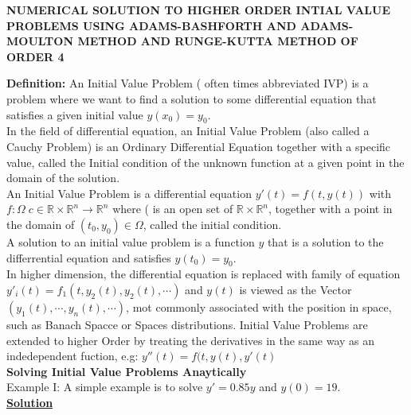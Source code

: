 \documentclass[a4paper 11pt]{article}
\newcommand{\bt}[1]{\textbf{#1}}
\newcommand{\NI}{\noindent}
\newcommand{\IVP}{Initial Value Problem }
\newcommand{\IVPs}{Initial Value Problems }
\newcommand{\realnum}{\mathbb{R}}
\newcommand{\sprime}{'}
\newcommand{\dprime}{''}
\begin{document}
\begin{center}
\textbf{NUMERICAL SOLUTION TO HIGHER ORDER INTIAL VALUE PROBLEMS USING ADAMS-BASHFORTH AND ADAMS-MOULTON METHOD AND RUNGE-KUTTA METHOD OF ORDER 4} \\[1.5cm]
\end{center}

\NI \bt{Definition:} An \IVP ( often times abbreviated IVP) is a problem where we want to find a solution to some differential equation that satisfies a given initial value \(\displaystyle y(x_0) = y_0\). \\

\NI In the field of differential equation, an \IVP (also called a Cauchy Problem) is an Ordinary Differential Equation together with a specific value, called the Initial condition of the unknown function at a given point in the domain of the solution.\\

\NI An \IVP is a differential equation  \( \displaystyle y\sprime(t) = f(t, y(t))\) with \( \displaystyle f:\Omega\; c \in \realnum \times \realnum^{n} \rightarrow \realnum^{n}\) where ( is an open set of \(\displaystyle \realnum \times \realnum^{n}\), together with a point in the domain of \((t_0,y_0) \in \Omega  \), called the initial condition.\\

\NI A solution to an initial value problem is a function \(y\) that is a solution to the differrential equation and satisfies \(\displaystyle y(t_0) = y_0\).\\

\NI In higher dimension, the differential equation is replaced with family of equation \(\displaystyle y\sprime_{i}(t) = f_{1}(t,y_{2}(t), y_2(t), \cdots)\) and \(y(t)\) is viewed as the Vector \(\displaystyle (y_{1}(t), \cdots, y_{n}(t), \cdots)\), mot commonly associated with the position in space, such as Banach Spacce or Spaces distributions. \IVPs are extended to higher Order by treating the derivatives in the same way as an indedependent fuction, e.g: \(y\dprime(t) = f(t, y(t), y\sprime(t)\)\\

\NI\bt{Solving Initial Value Problems Anaytically}\\
\NI Example I: A simple example is to solve \(y\sprime = 0.85y\) and \(y(0) = 19\).\\

\bt{\NI \underline{Solution}}\\
\end{document}
